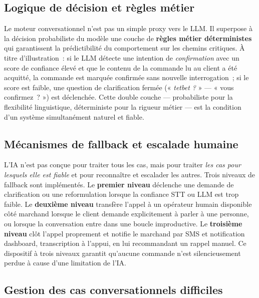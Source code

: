 \subsection{Logique de décision et règles métier}
\label{subsec:orchestration_decision}

Le moteur conversationnel n'est pas un simple proxy vers le LLM. Il superpose à la décision probabiliste du modèle une couche de \textbf{règles métier déterministes} qui garantissent la prédictibilité du comportement sur les chemins critiques. À titre d'illustration~: si le LLM détecte une intention de \emph{confirmation} avec un score de confiance élevé et que le contenu de la commande lu au client a été acquitté, la commande est marquée confirmée sans nouvelle interrogation~; si le score est faible, une question de clarification fermée (« \emph{tetbet ?} » — « vous confirmez~? ») est déclenchée. Cette double couche — probabiliste pour la flexibilité linguistique, déterministe pour la rigueur métier — est la condition d'un système simultanément naturel et fiable.

\subsection{Mécanismes de fallback et escalade humaine}
\label{subsec:orchestration_fallback}

L'IA n'est pas conçue pour traiter tous les cas, mais pour traiter \emph{les cas pour lesquels elle est fiable} et pour reconnaître et escalader les autres. Trois niveaux de fallback sont implémentés. Le \textbf{premier niveau} déclenche une demande de clarification ou une reformulation lorsque la confiance STT ou LLM est trop faible. Le \textbf{deuxième niveau} transfère l'appel à un opérateur humain disponible côté marchand lorsque le client demande explicitement à parler à une personne, ou lorsque la conversation entre dans une boucle improductive. Le \textbf{troisième niveau} clôt l'appel proprement et notifie le marchand par SMS et notification dashboard, transcription à l'appui, en lui recommandant un rappel manuel. Ce dispositif à trois niveaux garantit qu'aucune commande n'est silencieusement perdue à cause d'une limitation de l'IA.

\subsection{Gestion des cas conversationnels difficiles}
\label{subsec:orchestration_edge_cases}

